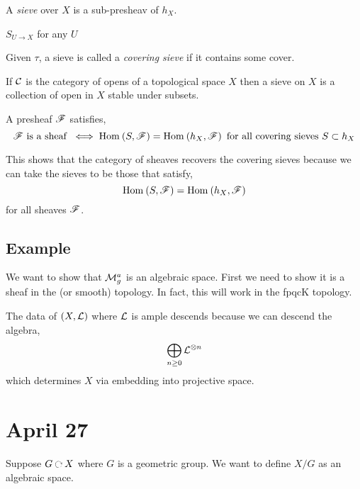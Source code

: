 \documentclass[12pt]{article}
\begin{document}
\begin{defn}
A \textit{sieve} over $X$ is a sub-presheav of $h_X$.
\end{defn}

\begin{example}
$S_{U \to X}$ for any $U$
\end{example}

\begin{defn}
Given $\tau$, a sieve is called a \textit{covering sieve} if it contains some cover.
\end{defn}

\begin{example}
If $\mathcal{C}$ is the category of opens of a topological space $X$ then a sieve on $X$ is a collection of open in $X$ stable under subsets. 
\end{example}

\begin{thm}
A presheaf $\mathscr{F}$ satisfies,
\[ \mathscr{F} \text{ is a sheaf } \iff \mathrm{Hom}_{} \left( S, \mathscr{F} \right) = \mathrm{Hom}_{} \left( h_X, \mathscr{F} \right) \text{ for all covering sieves } S \subset h_X \]
\end{thm}

\begin{rmk}
This shows that the category of sheaves recovers the covering sieves because we can take the sieves to be those that satisfy,
\[ \mathrm{Hom}_{} \left( S, \mathscr{F} \right) = \mathrm{Hom}_{} \left( h_X, \mathscr{F} \right) \]
for all sheaves $\mathscr{F}$.
\end{rmk}

\subsection{Example}


We want to show that $\mathcal{M}_g^a$ is an algebraic space. First we need to show it is a sheaf in the \etale (or smooth) topology. In fact, this will work in the fpqcK topology. 

\begin{thm}
The data of $(X, \mathcal{L})$ where $\mathcal{L}$ is ample descends because we can descend the algebra,
\[ \bigoplus_{n \ge 0} \mathcal{L}^{\otimes n} \]
which determines $X$ via embedding into projective space.
\end{thm}

\section{April 27}

Suppose $G \acts X$ where $G$ is a geometric group. We want to define $X / G$ as an algebraic space. 
\end{document}
